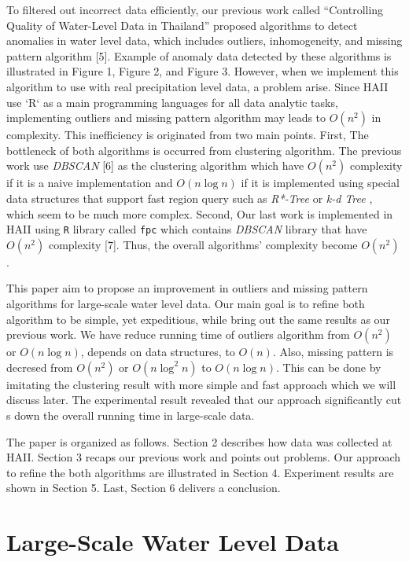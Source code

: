 \documentclass[conference]{IEEEtran}
\begin{document}
To filtered out incorrect data efficiently, our previous work called “Controlling Quality of Water-Level Data in Thailand” proposed algorithms to detect anomalies in water level data, which includes outliers, inhomogeneity, and missing pattern algorithm [5]. Example of anomaly data detected by these algorithms is illustrated in Figure 1, Figure 2, and Figure 3. However, when we implement this algorithm to use with real precipitation level data, a problem arise. Since HAII use `R` as a main programming languages for all data analytic tasks, implementing outliers and missing pattern algorithm may leads to $O(n^2)$ in complexity. This inefficiency is originated from two main points. First, The bottleneck of both algorithms is occurred from clustering algorithm. The previous work use \textit{DBSCAN} [6] as the clustering algorithm which have $O(n^2)$ complexity if it is a naive implementation and $O(n\log{n})$ if it is implemented using special data structures that support fast region query such as \textit{R*-Tree} or \textit{k-d Tree} , which seem to be much more complex. Second, Our last work is implemented in HAII using \texttt{R} library called \texttt{fpc} which contains \textit{DBSCAN} library that have $O(n^2)$ complexity [7]. Thus, the overall algorithms’ complexity become $O(n^2)$.

This paper aim to propose an improvement in outliers and missing pattern algorithms for large-scale water level data. Our main goal is to refine both algorithm to be simple, yet expeditious, while bring out the same results as our previous work. We have reduce running time of outliers algorithm from $O(n^2)$ or $O(n \log{n})$, depends on data structures, to $O(n)$. Also, missing pattern is decresed from $O(n^2)$ or $O(n \log^2{n})$ to $O(n \log{n})$. This can be  done by imitating the clustering result with more simple and fast approach which we will discuss later. The experimental result revealed that our approach significantly cut s down the overall running time in large-scale data.

The paper is organized as follows. Section 2 describes how data was collected at HAII. Section 3 recaps our previous work and points out problems. Our approach to refine the both algorithms are illustrated in Section 4. Experiment results are shown in Section 5. Last, Section 6 delivers a conclusion.

\section{Large-Scale Water Level Data}
\end{document}
